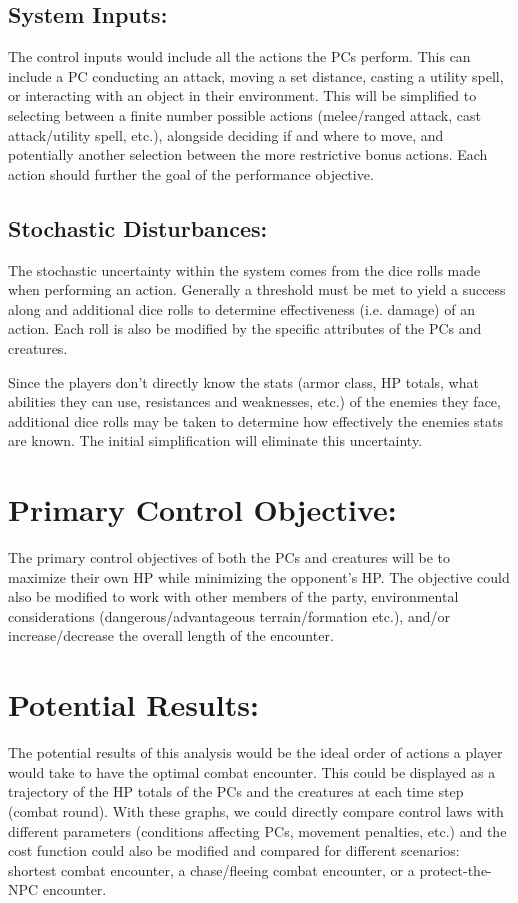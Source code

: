 \documentclass[9pt, onecolumn]{report}
\begin{document}
\subsection*{System Inputs:}
The control inputs would include all the actions the PCs perform.
This can include a PC conducting an attack, moving a set distance, casting a utility spell, or interacting with an object in their environment. 
This will be simplified to selecting between a finite number possible actions (melee/ranged attack, cast attack/utility spell, etc.), alongside deciding if and where to move, and potentially another selection between the more restrictive bonus actions. Each action should further the goal of the performance objective.

\subsection*{Stochastic Disturbances:}
The stochastic uncertainty within the system comes from the dice rolls made when performing an action.
Generally a threshold must be met to yield a success along and additional dice rolls to determine effectiveness (i.e. damage) of an action.
Each roll is also be modified by the specific attributes of the PCs and creatures.

Since the players don't directly know the stats (armor class, HP totals, what abilities they can use, resistances and weaknesses, etc.) of the enemies they face, additional dice rolls may be taken to determine how effectively the enemies stats are known.
The initial simplification will eliminate this uncertainty.

\section*{Primary Control Objective:}
The primary control objectives of both the PCs and creatures will be to maximize their own HP while minimizing the opponent's HP.
The objective could also be modified to work with other members of the party, environmental considerations (dangerous/advantageous terrain/formation etc.), and/or increase/decrease the overall length of the encounter.

\section*{Potential Results:}
The potential results of this analysis would be the ideal order of actions a player would take to have the optimal combat encounter. This could be displayed as a trajectory of the HP totals of the PCs and the creatures at each time step (combat round). With these graphs, we could directly compare control laws with different parameters (conditions affecting PCs, movement penalties, etc.) and the cost function could also be modified and compared for different scenarios: shortest combat encounter, a chase/fleeing combat encounter, or a protect-the-NPC encounter.
\end{document}
